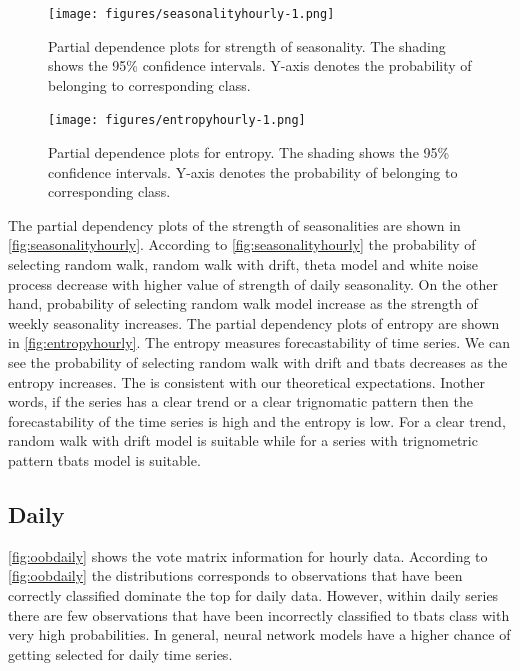 \documentclass[11pt,a4paper,]{article}
\begin{document}
\begin{figure}
\centering
\texttt{[image: figures/seasonalityhourly-1.png]}
\caption{\label{fig:seasonalityhourly}Partial dependence plots for strength
of seasonality. The shading shows the 95\% confidence intervals. Y-axis
denotes the probability of belonging to corresponding class.}
\end{figure}

\begin{figure}
\centering
\texttt{[image: figures/entropyhourly-1.png]}
\caption{\label{fig:entropyhourly}Partial dependence plots for entropy. The
shading shows the 95\% confidence intervals. Y-axis denotes the
probability of belonging to corresponding class.}
\end{figure}

The partial dependency plots of the strength of seasonalities are shown
in \autoref{fig:seasonalityhourly}. According to
\autoref{fig:seasonalityhourly} the probability of selecting random
walk, random walk with drift, theta model and white noise process
decrease with higher value of strength of daily seasonality. On the
other hand, probability of selecting random walk model increase as the
strength of weekly seasonality increases. The partial dependency plots
of entropy are shown in \autoref{fig:entropyhourly}. The entropy
measures forecastability of time series. We can see the probability of
selecting random walk with drift and tbats decreases as the entropy
increases. The is consistent with our theoretical expectations. Inother
words, if the series has a clear trend or a clear trignomatic pattern
then the forecastability of the time series is high and the entropy is
low. For a clear trend, random walk with drift model is suitable while
for a series with trignometric pattern tbats model is suitable.

\subsection{Daily}\label{daily}

\autoref{fig:oobdaily} shows the vote matrix information for hourly
data. According to \autoref{fig:oobdaily} the distributions corresponds
to observations that have been correctly classified dominate the top for
daily data. However, within daily series there are few observations that
have been incorrectly classified to tbats class with very high
probabilities. In general, neural network models have a higher chance of
getting selected for daily time series.
\end{document}
